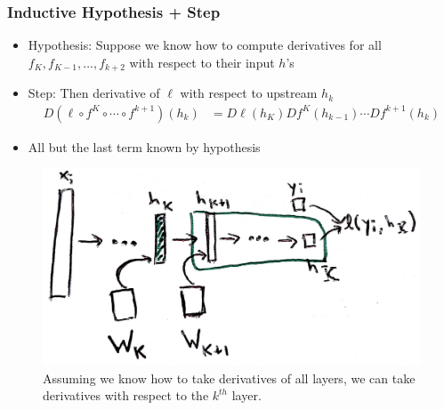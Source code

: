 \documentclass[10pt,mathserif]{beamer}
\begin{document}
\begin{frame}
  \frametitle{Inductive Hypothesis + Step}
  \begin{itemize}
  \item Hypothesis: Suppose we know how to compute derivatives for all $f_{K},
    f_{K - 1}, \dots, f_{k + 2}$ with respect to their input $h$'s
  \item Step: Then derivative of $\ell$ with respect to upstream $h_k$
    \begin{align*}
      D\left(\ell \circ f^{K}\circ \cdots \circ f^{k + 1}\right)\left(h_{k}\right) &=
      D\ell\left(h_{K}\right) Df^{K}\left(h_{k - 1}\right)\cdots Df^{k + 1}\left(h_{k}\right)
    \end{align*}
  \item All but the last term known by hypothesis
  \end{itemize}
\begin{figure}[ht]
  \centering
  \includegraphics[width=0.5\paperwidth]{figure/backprop_inductive_step}
  \caption{Assuming we know how to take derivatives of all layers, we can take
    derivatives with respect to the $k^{th}$
    layer. \label{fig:backprop_inductive_step} }
\end{figure}
\end{frame}
\end{document}
